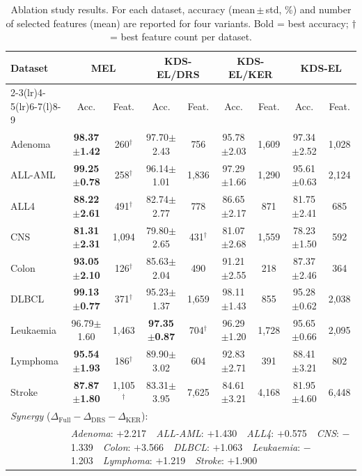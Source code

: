 \begin{table}[t]
\centering
\caption{Ablation study results. For each dataset, accuracy (mean\,$\pm$\,std, \%) and
number of selected features (mean) are reported for four variants.
Bold = best accuracy; $\dagger$ = best feature count per dataset.}
\label{tab:ablation}
\setlength{\tabcolsep}{4pt}
\begin{tabular}{lcccccccc}
\toprule
\textbf{Dataset} & \multicolumn{2}{c}{\textbf{MEL}} & \multicolumn{2}{c}{\textbf{KDS-EL/DRS}} & \multicolumn{2}{c}{\textbf{KDS-EL/KER}} & \multicolumn{2}{c}{\textbf{KDS-EL}} \\
\cmidrule(r){2-3}\cmidrule(lr){4-5}\cmidrule(lr){6-7}\cmidrule(l){8-9}
 & Acc. & Feat. & Acc. & Feat. & Acc. & Feat. & Acc. & Feat. \\
\midrule
Adenoma & \textbf{98.37$\pm$1.42} & 260$^\dagger$ & 97.70$\pm$2.43 & 756 & 95.78$\pm$2.03 & 1,609 & 97.34$\pm$2.52 & 1,028 \\
ALL-AML & \textbf{99.25$\pm$0.78} & 258$^\dagger$ & 96.14$\pm$1.01 & 1,836 & 97.29$\pm$1.66 & 1,290 & 95.61$\pm$0.63 & 2,124 \\
ALL4 & \textbf{88.22$\pm$2.61} & 491$^\dagger$ & 82.74$\pm$2.77 & 778 & 86.65$\pm$2.17 & 871 & 81.75$\pm$2.41 & 685 \\
CNS & \textbf{81.31$\pm$2.31} & 1,094 & 79.80$\pm$2.65 & 431$^\dagger$ & 81.07$\pm$2.68 & 1,559 & 78.23$\pm$1.50 & 592 \\
Colon & \textbf{93.05$\pm$2.10} & 126$^\dagger$ & 85.63$\pm$2.04 & 490 & 91.21$\pm$2.55 & 218 & 87.37$\pm$2.46 & 364 \\
DLBCL & \textbf{99.13$\pm$0.77} & 371$^\dagger$ & 95.23$\pm$1.37 & 1,659 & 98.11$\pm$1.43 & 855 & 95.28$\pm$0.62 & 2,038 \\
Leukaemia & 96.79$\pm$1.60 & 1,463 & \textbf{97.35$\pm$0.87} & 704$^\dagger$ & 96.29$\pm$1.20 & 1,728 & 95.65$\pm$0.66 & 2,095 \\
Lymphoma & \textbf{95.54$\pm$1.93} & 186$^\dagger$ & 89.90$\pm$3.02 & 604 & 92.83$\pm$2.71 & 391 & 88.41$\pm$3.21 & 802 \\
Stroke & \textbf{87.87$\pm$1.80} & 1,105$^\dagger$ & 83.31$\pm$3.95 & 7,625 & 84.61$\pm$3.21 & 4,168 & 81.95$\pm$4.60 & 6,448 \\
\midrule
\multicolumn{9}{l}{\textit{Synergy} ($\Delta_\text{Full} - \Delta_\text{DRS} - \Delta_\text{KER}$):} \\
 & \multicolumn{8}{l}{\textit{Adenoma}: $+$2.217~~\textit{ALL-AML}: $+$1.430~~\textit{ALL4}: $+$0.575~~\textit{CNS}: $-$1.339~~\textit{Colon}: $+$3.566~~\textit{DLBCL}: $+$1.063~~\textit{Leukaemia}: $-$1.203~~\textit{Lymphoma}: $+$1.219~~\textit{Stroke}: $+$1.900} \\
\bottomrule
\end{tabular}
\end{table}